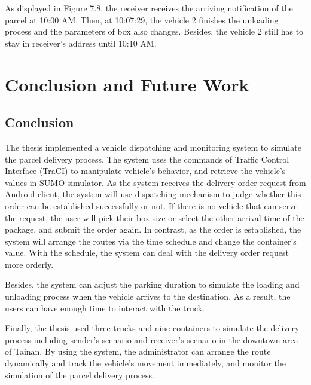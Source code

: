 \documentclass[12pt]{ksthesis}
\begin{document}
\begin{thesis}
{As displayed in Figure 7.8, the receiver receives the arriving notification of the parcel at 10:00 AM. Then, at 10:07:29, the vehicle 2 finishes the unloading process and the parameters of box also changes. Besides, the vehicle 2 still has to stay in receiver’s address until 10:10 AM.














\chapter{Conclusion and Future Work} \label{Chap:Conclusion}

\section{Conclusion}
The thesis implemented a vehicle dispatching and monitoring system to simulate the parcel delivery process. The system uses the commands of Traffic Control Interface (TraCI) to manipulate vehicle’s behavior, and retrieve the vehicle’s values in SUMO simulator. As the system receives the delivery order request from Android client, the system will use dispatching mechanism to judge whether this order can be established successfully or not. If there is no vehicle that can serve the request, the user will pick their box size or select the other arrival time of the package, and submit the order again. In contrast, as the order is established, the system will arrange the routes via the time schedule and change the container’s value. With the schedule, the system can deal with the delivery order request more orderly. 

Besides, the system can adjust the parking duration to simulate the loading and unloading process when the vehicle arrives to the destination. As a result, the users can have enough time to interact with the truck. 

Finally, the thesis used three trucks and nine containers to simulate the delivery process including sender’s scenario and receiver’s scenario in the downtown area of Tainan. By using the system, the administrator can arrange the route dynamically and track the vehicle’s movement immediately, and monitor the simulation of the parcel delivery process.




}
\end{thesis}
\end{document}
